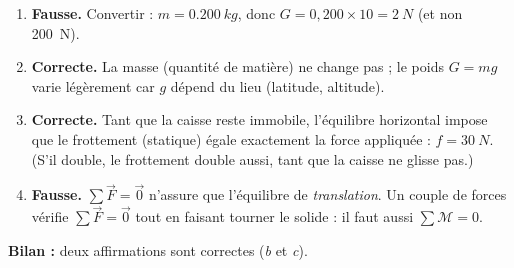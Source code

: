 \documentclass[11pt,a4paper]{article}
\newcommand{\vv}[1]{\vec{#1}}\newcommand{\ds}{\displaystyle}
\begin{document}
\begin{corrige}
\begin{enumerate}[label=\alph*)]
  \item \textbf{Fausse.} Convertir : $m=\qty{0.200}{kg}$, donc $G = 0{,}200\times 10 = \qty{2}{N}$
        (et non \qty{200}{N}).
  \item \textbf{Correcte.} La masse (quantité de matière) ne change pas ; le poids $G=mg$ varie
        légèrement car $g$ dépend du lieu (latitude, altitude).
  \item \textbf{Correcte.} Tant que la caisse reste immobile, l'équilibre horizontal impose que le
        frottement (statique) égale exactement la force appliquée : $f=\qty{30}{N}$. (S'il double,
        le frottement double aussi, tant que la caisse ne glisse pas.)
  \item \textbf{Fausse.} $\sum\vv F=\vv 0$ n'assure que l'équilibre de \emph{translation}. Un couple de
        forces vérifie $\sum\vv F=\vv 0$ tout en faisant tourner le solide : il faut aussi
        $\sum\mathcal{M}=0$.
\end{enumerate}
\textbf{Bilan :} deux affirmations sont correctes (\emph{b} et \emph{c}).
\end{corrige}
\end{document}
